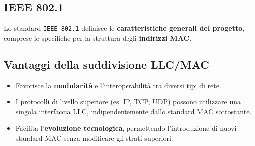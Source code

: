\subsection*{IEEE 802.1}
Lo standard \texttt{IEEE 802.1} definisce le \textbf{caratteristiche generali del progetto}, comprese le specifiche per la struttura degli \textbf{indirizzi MAC}.



\subsection*{Vantaggi della suddivisione LLC/MAC}
\begin{itemize}
    \item Favorisce la \textbf{modularità} e l'interoperabilità tra diversi tipi di rete.
    \item I protocolli di livello superiore (es. IP, TCP, UDP) possono utilizzare una singola interfaccia LLC, indipendentemente dallo standard MAC sottostante.
    \item Facilita l'\textbf{evoluzione tecnologica}, permettendo l'introduzione di nuovi standard MAC senza modificare gli strati superiori.
\end{itemize}









